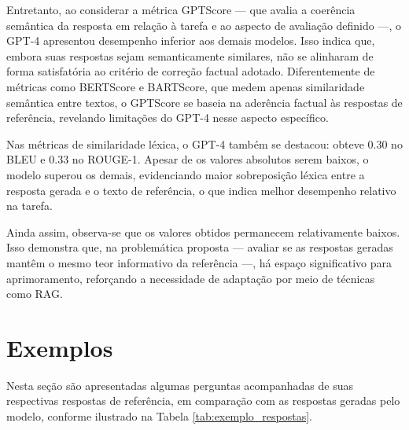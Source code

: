 Entretanto, ao considerar a métrica GPTScore — que avalia a coerência semântica da resposta em relação à tarefa e ao aspecto de avaliação definido —, o GPT-4 apresentou desempenho inferior aos demais modelos. Isso indica que, embora suas respostas sejam semanticamente similares, não se alinharam de forma satisfatória ao critério de correção factual adotado. Diferentemente de métricas como BERTScore e BARTScore, que medem apenas similaridade semântica entre textos, o GPTScore se baseia na aderência factual às respostas de referência, revelando limitações do GPT-4 nesse aspecto específico.

Nas métricas de similaridade léxica, o GPT-4 também se destacou: obteve 0.30 no BLEU e 0.33 no ROUGE-1. Apesar de os valores absolutos serem baixos, o modelo superou os demais, evidenciando maior sobreposição léxica entre a resposta gerada e o texto de referência, o que indica melhor desempenho relativo na tarefa.

Ainda assim, observa-se que os valores obtidos permanecem relativamente baixos. Isso demonstra que, na problemática proposta — avaliar se as respostas geradas mantêm o mesmo teor informativo da referência —, há espaço significativo para aprimoramento, reforçando a necessidade de adaptação por meio de técnicas como RAG.

\section{Exemplos}

Nesta seção são apresentadas algumas perguntas acompanhadas de suas respectivas respostas de referência, em comparação com as respostas geradas pelo modelo, conforme ilustrado na Tabela \ref{tab:exemplo_respostas}.

